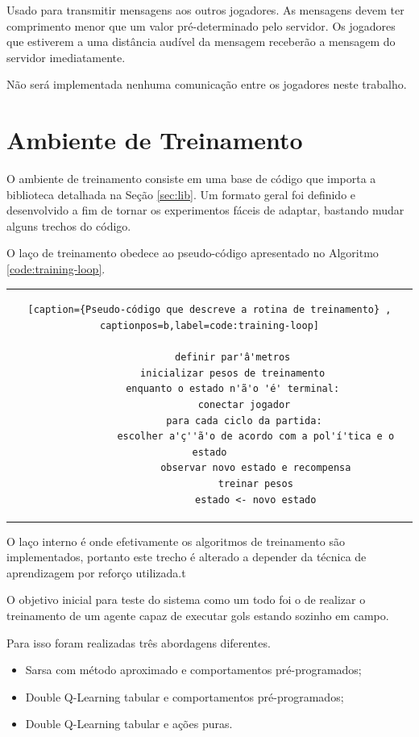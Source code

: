Usado para transmitir mensagens aos outros jogadores. As mensagens devem ter comprimento menor que um valor pré-determinado pelo servidor. Os jogadores que estiverem a uma distância audível da mensagem receberão a mensagem do servidor imediatamente.

Não será implementada nenhuma comunicação entre os jogadores neste trabalho.


\section{Ambiente de Treinamento}

O ambiente de treinamento consiste em uma base de código que importa a biblioteca detalhada na Seção \ref{sec:lib}. Um formato geral foi definido e desenvolvido a fim de tornar os experimentos fáceis de adaptar, bastando mudar alguns trechos do código.

O laço de treinamento obedece ao pseudo-código apresentado no Algoritmo \ref{code:training-loop}.

\begin{tabular}{c}
	\begin{lstlisting}[caption={Pseudo-código que descreve a rotina de treinamento} , captionpos=b,label=code:training-loop]
		
		definir par'â'metros
		inicializar pesos de treinamento
		enquanto o estado n'ã'o 'é' terminal:
			conectar jogador
			para cada ciclo da partida:
				escolher a'ç''ã'o de acordo com a pol'í'tica e o estado
				observar novo estado e recompensa
				treinar pesos
				estado <- novo estado
	\end{lstlisting}
\end{tabular}

O laço interno é onde efetivamente os algoritmos de treinamento são implementados, portanto este trecho é alterado a depender da técnica de aprendizagem por reforço utilizada.t

O objetivo inicial para teste do sistema como um todo foi o de realizar o treinamento de um agente capaz de executar gols estando sozinho em campo.

Para isso foram realizadas três abordagens diferentes.

\begin{itemize}
	\item Sarsa com método aproximado e comportamentos pré-programados;
	\item Double Q-Learning tabular e comportamentos pré-programados;
	\item Double Q-Learning tabular e ações puras.
\end{itemize}

